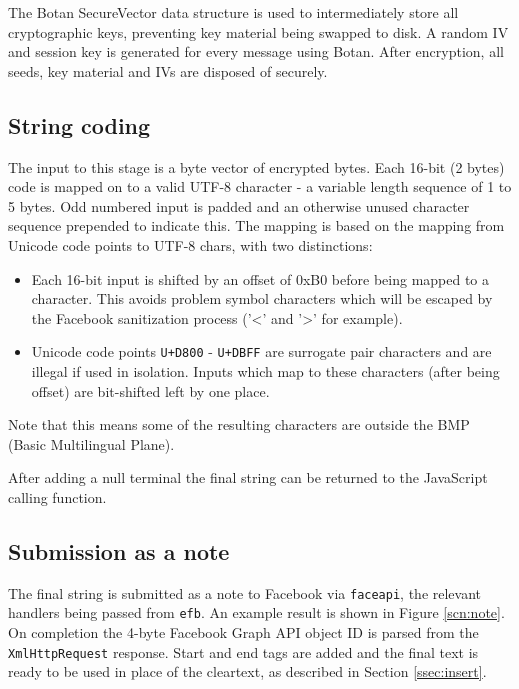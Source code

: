 The Botan SecureVector data structure is used to intermediately store all cryptographic keys, preventing key material being swapped to disk. A random IV and session key is generated for every message using Botan. After encryption, all seeds, key material and IVs are disposed of securely.


\FloatBarrier
\subsection{String coding}
\label{ssec:utf8}

The input to this stage is a byte vector of encrypted bytes. Each 16-bit (2 bytes) code is mapped on to a valid UTF-8 character - a variable length sequence of 1 to 5 bytes. Odd numbered input is padded and an otherwise unused character sequence prepended to indicate this. The mapping is based on the mapping from Unicode code points to UTF-8 chars, with two distinctions:

\begin{itemize}

    \item Each 16-bit input is shifted by an offset of 0xB0 before being mapped to a character. This avoids problem symbol characters which will be escaped by the Facebook sanitization process ('<' and '>' for example).
    
    \item Unicode code points {\tt U+D800} - {\tt U+DBFF} are surrogate pair characters and are illegal if used in isolation. Inputs which map to these characters (after being offset) are bit-shifted left by one place.
    
\end{itemize}


Note that this means some of the resulting characters are outside the BMP (Basic Multilingual Plane).

After adding a null terminal the final string can be returned to the JavaScript calling function.


\FloatBarrier
\subsection{Submission as a note}
\label{ssec:submitnote}

The final string is submitted as a note to Facebook via {\tt faceapi}, the relevant handlers being passed from {\tt efb}. An example result is shown in Figure \ref{scn:note}. On completion the 4-byte Facebook Graph API object ID is parsed from the {\tt XmlHttpRequest} response.  Start and end tags are added and the final text is ready to be used in place of the cleartext, as described in Section \ref{ssec:insert}.


